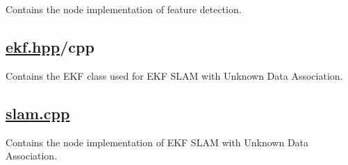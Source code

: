 Contains the node implementation of feature detection.

\subsection*{\hyperlink{ekf_8hpp}{ekf.\+hpp}/cpp}

Contains the E\+KF class used for E\+KF S\+L\+AM with Unknown Data Association.

\subsection*{\hyperlink{slam_8cpp}{slam.\+cpp}}

Contains the node implementation of E\+KF S\+L\+AM with Unknown Data Association. 